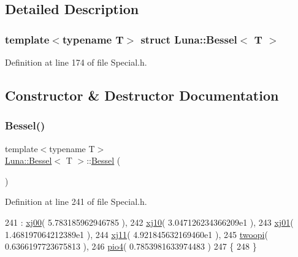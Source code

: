 \subsection{Detailed Description}
\subsubsection*{template$<$typename T$>$\newline
struct Luna\+::\+Bessel$<$ T $>$}



Definition at line 174 of file Special.\+h.



\subsection{Constructor \& Destructor Documentation}
\mbox{\label{structLuna_1_1Bessel_aefa78789b4db0a57f4a6f178ebba1d7f}} 
\subsubsection{\texorpdfstring{Bessel()}{Bessel()}}
{\footnotesize\ttfamily template$<$typename T$>$ \\
\hyperlink{structLuna_1_1Bessel}{Luna\+::\+Bessel}$<$ T $>$\+::\hyperlink{structLuna_1_1Bessel}{Bessel} (\begin{DoxyParamCaption}{ }\end{DoxyParamCaption})\hspace{0.3cm}{\ttfamily [inline]}}



Definition at line 241 of file Special.\+h.


\begin{DoxyCode}
241                : \hyperlink{structLuna_1_1Bessel_a69e31bcef81cee0b64a40efd2c6195ac}{xj00}( 5.783185962946785 ),
242                  \hyperlink{structLuna_1_1Bessel_a40044c24955f5e771fd8cbef9fd06397}{xj10}( 3.047126234366209e1 ),
243                  \hyperlink{structLuna_1_1Bessel_a9423de154e56c25f2615deaa699e1ad2}{xj01}( 1.468197064212389e1 ),
244                  \hyperlink{structLuna_1_1Bessel_a7120d0fce9cdd7c7f650fb113d56a2ee}{xj11}( 4.921845632169460e1 ),
245                  \hyperlink{structLuna_1_1Bessel_a4c3a3f91a127b39c913845c77f377c79}{twoopi}( 0.6366197723675813 ),
246                  \hyperlink{structLuna_1_1Bessel_a25963b9942422f3d48c0239e8be57f0c}{pio4}( 0.7853981633974483 )
247       \{
248       \}
\end{DoxyCode}


